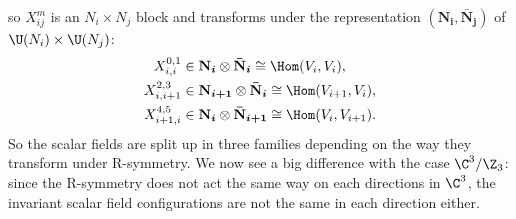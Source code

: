 \documentclass{worksheetclass}
\begin{document}
        so $X^m_{ij}$ is an $N_i\times N_j$ block and transforms under the representation $(\boldsymbol{\textbf{N}_i},\boldsymbol{\bar{\textbf{N}}_j})$ of $\U(N_i)\times\U(N_j)$:
        \begin{align}
            X^{0,1}_{i,i} &\in \boldsymbol{\textbf{N}_i}\otimes\boldsymbol{\bar{\textbf{N}}_i} \cong \Hom(V_i,V_i),\label{eq:N2Znrepr1}\\
            X^{2,3}_{i,i+1} &\in \boldsymbol{\textbf{N}_{i+1}}\otimes\boldsymbol{\bar{\textbf{N}}_i} \cong \Hom(V_{i+1},V_i),\label{eq:N2Znrepr2}\\
            X^{4,5}_{i+1,i} &\in \boldsymbol{\textbf{N}_i}\otimes\boldsymbol{\bar{\textbf{N}}_{i+1}} \cong \Hom(V_i,V_{i+1}).\label{eq:N2Znrepr3}
        \end{align}
        So the scalar fields are split up in three families depending on the way they transform under R-symmetry. We now see a big difference with the case $\C^3/\Z_3$: since the R-symmetry does not act the same way on each directions in $\C^3$, the invariant scalar field configurations are not the same in each direction either.
\end{document}
